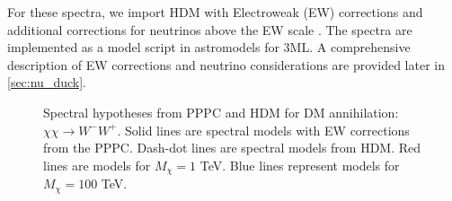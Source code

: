 For these spectra, we import HDM with Electroweak (EW) corrections and additional corrections for neutrinos above the EW scale \cite{Rodd:HDM_spec}.
The spectra are implemented as a model script in astromodels for 3ML.
A comprehensive description of EW corrections and neutrino considerations are provided later in \cref{sec:nu_duck}.

\begin{figure}[t]
    \caption{Spectral hypotheses from PPPC \cite{Cirelli_2011} and HDM \cite{Rodd:HDM_spec} for DM annihilation: $\chi\chi \rightarrow W^-W^+$. Solid lines are spectral models with EW corrections from the PPPC. Dash-dot lines are spectral models from HDM. Red lines are models for $M_\chi = 1$ TeV. Blue lines represent models for $M_\chi = 100$ TeV.}
    \label{fig:pppc_vs_hdm}
\end{figure}

